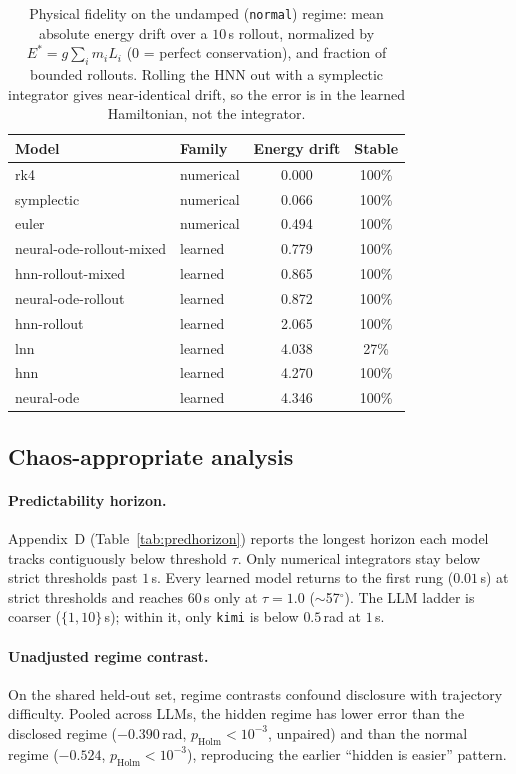 \documentclass{article}
\begin{document}
\begin{table}[tbp]
\centering\small
\caption{Physical fidelity on the undamped (\texttt{normal}) regime: mean absolute energy
drift over a $10$\,s rollout, normalized by $E^{*}{=}g\sum_i m_i L_i$ (0 = perfect
conservation), and fraction of bounded rollouts. Rolling the HNN out with a symplectic
integrator gives near-identical drift, so the error is in the learned Hamiltonian, not the
integrator.}\label{tab:energy}
\begin{tabular}{llcc}
\toprule
Model & Family & Energy drift & Stable \\
\midrule
rk4 & numerical & 0.000 & 100\% \\
symplectic & numerical & 0.066 & 100\% \\
euler & numerical & 0.494 & 100\% \\
neural-ode-rollout-mixed & learned & 0.779 & 100\% \\
hnn-rollout-mixed & learned & 0.865 & 100\% \\
neural-ode-rollout & learned & 0.872 & 100\% \\
hnn-rollout & learned & 2.065 & 100\% \\
lnn & learned & 4.038 & 27\% \\
hnn & learned & 4.270 & 100\% \\
neural-ode & learned & 4.346 & 100\% \\
\bottomrule
\end{tabular}
\end{table}

\subsection{Chaos-appropriate analysis}
\label{sec:sysid}
\paragraph{Predictability horizon.} Appendix~D (Table~\ref{tab:predhorizon}) reports the
longest horizon each model tracks contiguously below threshold $\tau$. Only numerical
integrators stay below strict thresholds past $1$\,s. Every learned model returns to the
first rung ($0.01$\,s) at strict thresholds and reaches $60$\,s only at
$\tau{=}1.0$ ($\sim$57$^\circ$). The LLM ladder is coarser ($\{1,10\}$\,s); within it, only
\texttt{kimi} is below $0.5$\,rad at $1$\,s.


\paragraph{Unadjusted regime contrast.} On the shared held-out set, regime contrasts
confound disclosure with trajectory difficulty. Pooled across LLMs, the hidden regime has
lower error than the disclosed regime ($-0.390$\,rad, $p_{\mathrm{Holm}}{<}10^{-3}$,
unpaired) and than the normal regime ($-0.524$, $p_{\mathrm{Holm}}{<}10^{-3}$), reproducing
the earlier ``hidden is easier'' pattern.
\end{document}

